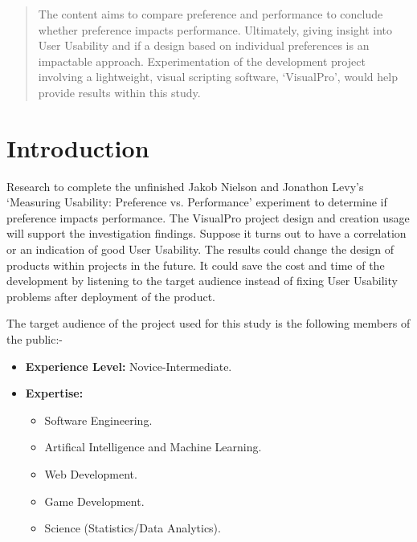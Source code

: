 \documentclass[a0,portrait]{a0poster}
\begin{document}
\begin{multicols}{2} %


\color{ku} %

\begin{abstract}
    The content aims to compare preference and performance to conclude whether preference impacts performance. Ultimately, giving insight into User Usability and if a design based on individual preferences is an impactable approach. Experimentation of the development project involving a lightweight, visual scripting software, `VisualPro', would help provide results within this study.
\end{abstract}


\color{DarkRed} %

\section*{Introduction}
    Research to complete the unfinished Jakob Nielson and Jonathon Levy's~\cite{nielsen_measuring_1994} `Measuring Usability: Preference vs. Performance' experiment to determine if preference impacts performance. The VisualPro project design and creation usage will support the investigation findings. Suppose it turns out to have a correlation or an indication of good User Usability. The results could change the design of products within projects in the future. It could save the cost and time of the development by listening to the target audience instead of fixing User Usability problems after deployment of the product.

    The target audience of the project used for this study is the following members of the public:-
    \begin{itemize}
        \item  \textbf{Experience Level:} Novice-Intermediate.
        \item \textbf{Expertise:}
        \begin{itemize}
            \item Software Engineering.
            \item Artifical Intelligence and Machine Learning.
            \item Web Development.
            \item Game Development.
            \item Science (Statistics/Data Analytics).
        \end{itemize}
    \end{itemize}


\end{multicols}
\end{document}
